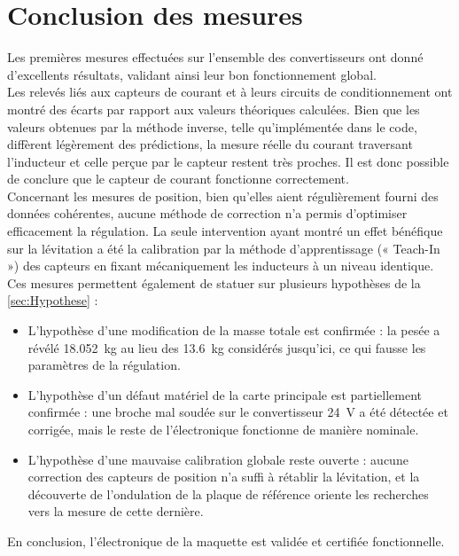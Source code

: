 \section{Conclusion des mesures}
Les premières mesures effectuées sur l'ensemble des convertisseurs ont donné d'excellents résultats, validant ainsi leur bon fonctionnement global.\\

Les relevés liés aux capteurs de courant et à leurs circuits de conditionnement ont montré des écarts par rapport aux valeurs théoriques calculées. Bien que les valeurs obtenues par la méthode inverse, telle qu'implémentée dans le code, diffèrent légèrement des prédictions, la mesure réelle du courant traversant l'inducteur et celle perçue par le capteur restent très proches. Il est donc possible de conclure que le capteur de courant fonctionne correctement.\\

Concernant les mesures de position, bien qu'elles aient régulièrement fourni des données cohérentes, aucune méthode de correction n'a permis d'optimiser efficacement la régulation. La seule intervention ayant montré un effet bénéfique sur la lévitation a été la calibration par la méthode d'apprentissage (« Teach-In ») des capteurs en fixant mécaniquement les inducteurs à un niveau identique.\\

Ces mesures permettent également de statuer sur plusieurs hypothèses de la \autoref{sec:Hypothese} :
\begin{itemize}
    \item L'hypothèse d'une modification de la masse totale est confirmée : la pesée a révélé 18.052~kg au lieu des 13.6~kg considérés jusqu'ici, ce qui fausse les paramètres de la régulation.
    \item L'hypothèse d'un défaut matériel de la carte principale est partiellement confirmée : une broche mal soudée sur le convertisseur 24~V a été détectée et corrigée, mais le reste de l'électronique fonctionne de manière nominale.
    \item L'hypothèse d'une mauvaise calibration globale reste ouverte : aucune correction des capteurs de position n'a suffi à rétablir la lévitation, et la découverte de l'ondulation de la plaque de référence oriente les recherches vers la mesure de cette dernière.
\end{itemize}

En conclusion, l'électronique de la maquette est validée et certifiée fonctionnelle.